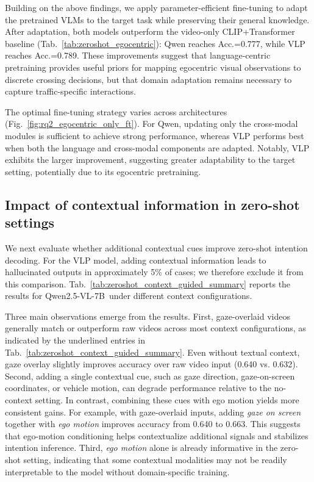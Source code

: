 \documentclass[letterpaper, 10pt, journal]{IEEEtran}  %
\newcommand{\qwensevenb}{Qwen2.5-VL-7B}
\begin{document}
Building on the above findings, we apply parameter-efficient fine-tuning to adapt the pretrained VLMs to the target task while preserving their general knowledge. After adaptation, both models outperform the video-only CLIP+Transformer baseline (Tab.~\ref{tab:zeroshot_egocentric}): Qwen reaches Acc.=0.777, while VLP reaches Acc.=0.789. These improvements suggest that language-centric pretraining provides useful priors for mapping egocentric visual observations to discrete crossing decisions, but that domain adaptation remains necessary to capture traffic-specific interactions.




The optimal fine-tuning strategy varies across architectures (Fig.~\ref{fig:rq2_egocentric_only_ft}). For Qwen, updating only the cross-modal modules is sufficient to achieve strong performance, whereas VLP performs best when both the language and cross-modal components are adapted. Notably, VLP exhibits the larger improvement, suggesting greater adaptability to the target setting, potentially due to its egocentric pretraining.





\subsection{Impact of contextual information in zero-shot settings}

We next evaluate whether additional contextual cues improve zero-shot intention decoding. For the VLP model, adding contextual information leads to hallucinated outputs in approximately 5\% of cases; we therefore exclude it from this comparison. Tab.~\ref{tab:zeroshot_context_guided_summary} reports the results for \qwensevenb\ under different context configurations.

Three main observations emerge from the results. 
First, gaze-overlaid videos generally match or outperform raw videos across most context configurations, as indicated by the underlined entries in Tab.~\ref{tab:zeroshot_context_guided_summary}. Even without textual context, gaze overlay slightly improves accuracy over raw video input (0.640 vs. 0.632).
Second, adding a single contextual cue, such as gaze direction, gaze-on-screen coordinates, or vehicle motion, can degrade performance relative to the no-context setting. In contrast, combining these cues with ego motion yields more consistent gains. For example, with gaze-overlaid inputs, adding \emph{gaze on screen} together with \emph{ego motion} improves accuracy from 0.640 to 0.663. This suggests that ego-motion conditioning helps contextualize additional signals and stabilizes intention inference.
Third, \emph{ego motion} alone is already informative in the zero-shot setting, indicating that some contextual modalities may not be readily interpretable to the model without domain-specific training.
\end{document}
